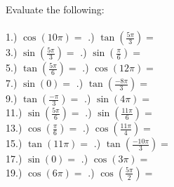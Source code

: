 \documentclass[12pt]{article}
\begin{document}
Evaluate the following:
\\\\

1.) $\cos(10\pi) = $ \underline{\hspace{2cm}} \indent\indent\indent{}.) $\tan(\frac{5\pi}{3}) = $ \underline{\hspace{2cm}} \\

3.) $\sin(\frac{5\pi}{3}) = $ \underline{\hspace{2cm}} \indent\indent\indent{}.) $\sin(\frac{\pi}{6}) = $ \underline{\hspace{2cm}} \\

5.) $\tan(\frac{5\pi}{6}) = $ \underline{\hspace{2cm}} \indent\indent\indent{}.) $\cos(12\pi) = $ \underline{\hspace{2cm}} \\

7.) $\sin(0) = $ \underline{\hspace{2cm}} \indent\indent\indent{}.) $\tan(\frac{-8\pi}{3}) = $ \underline{\hspace{2cm}} \\

9.) $\tan(\frac{-\pi}{3}) = $ \underline{\hspace{2cm}} \indent\indent\indent{}.) $\sin(4\pi) = $ \underline{\hspace{2cm}} \\

11.) $\sin(\frac{5\pi}{6}) = $ \underline{\hspace{2cm}} \indent\indent\indent{}.) $\sin(\frac{11\pi}{6}) = $ \underline{\hspace{2cm}} \\

13.) $\cos(\frac{\pi}{6}) = $ \underline{\hspace{2cm}} \indent\indent\indent{}.) $\cos(\frac{11\pi}{4}) = $ \underline{\hspace{2cm}} \\

15.) $\tan(11\pi) = $ \underline{\hspace{2cm}} \indent\indent\indent{}.) $\tan(\frac{-10\pi}{3}) = $ \underline{\hspace{2cm}} \\

17.) $\sin(0) = $ \underline{\hspace{2cm}} \indent\indent\indent{}.) $\cos(3\pi) = $ \underline{\hspace{2cm}} \\

19.) $\cos(6\pi) = $ \underline{\hspace{2cm}} \indent\indent\indent{}.) $\cos(\frac{5\pi}{2}) = $ \underline{\hspace{2cm}} \\
\end{document}
